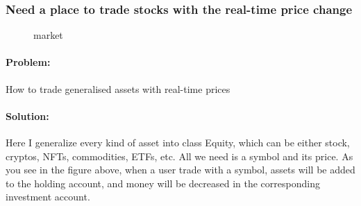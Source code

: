 \documentclass[a4paper,12pt]{report}
\begin{document}
\subsubsection*{Need a place to trade stocks with the real-time price change}
    \begin{figure}[H]
    \centering{}
    \caption{market}
    \label{img:market}
    \end{figure}

    \paragraph{Problem:} How to trade generalised assets with real-time prices

    \paragraph*{Solution:} Here I generalize every kind of asset into class Equity, which can be either stock, cryptos, NFTs, commodities, ETFs, etc. All we need is a symbol and its price. As you see in the figure above, when a user trade with a symbol, assets will be added to the holding account, and money will be decreased in the corresponding investment account.
\end{document}

